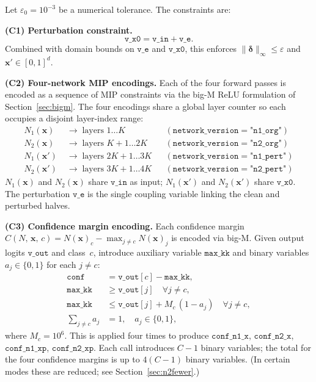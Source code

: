 \documentclass[11pt,a4paper]{article}
\theoremstyle{definition}
\theoremstyle{plain}
\newcommand{\Conf}[3]{C(#1,\,#2,\,#3)}
\newcommand{\NN}[1]{N_{#1}}
\newcommand{\vx}{\mathbf{x}}
\newcommand{\ve}{\boldsymbol{\delta}}
\newcommand{\vxp}{\mathbf{x}'}
\newcommand{\eps}{\varepsilon}
\newcommand{\epszero}{\varepsilon_0}
\begin{document}
Let $\epszero = 10^{-3}$ be a numerical tolerance. The constraints are:

\medskip
\noindent\textbf{(C1) Perturbation constraint.}
\[
  \mathtt{v\_x0} = \mathtt{v\_in} + \mathtt{v\_e}.
\]
Combined with domain bounds on $\mathtt{v\_e}$ and $\mathtt{v\_x0}$, this enforces $\|\ve\|_\infty \le \eps$ and $\vxp \in [0,1]^d$.

\medskip
\noindent\textbf{(C2) Four-network MIP encodings.}
Each of the four forward passes is encoded as a sequence of MIP constraints via the big-M ReLU formulation of Section~\ref{sec:bigm}. The four encodings share a global layer counter so each occupies a disjoint layer-index range:
\begin{align*}
  \NN{1}(\vx)  &\;\to\; \text{layers } 1\ldots K           &&(\texttt{network\_version} = \texttt{"n1\_org"})  \\
  \NN{2}(\vx)  &\;\to\; \text{layers } K+1\ldots 2K         &&(\texttt{network\_version} = \texttt{"n2\_org"})  \\
  \NN{1}(\vxp) &\;\to\; \text{layers } 2K+1\ldots 3K        &&(\texttt{network\_version} = \texttt{"n1\_pert"}) \\
  \NN{2}(\vxp) &\;\to\; \text{layers } 3K+1\ldots 4K        &&(\texttt{network\_version} = \texttt{"n2\_pert"})
\end{align*}
$\NN{1}(\vx)$ and $\NN{2}(\vx)$ share $\mathtt{v\_in}$ as input; $\NN{1}(\vxp)$ and $\NN{2}(\vxp)$ share $\mathtt{v\_x0}$. The perturbation $\mathtt{v\_e}$ is the single coupling variable linking the clean and perturbed halves.

\medskip
\noindent\textbf{(C3) Confidence margin encoding.}
Each confidence margin $\Conf{N}{\vx}{c} = N(\vx)_c - \max_{j\ne c} N(\vx)_j$ is encoded via big-M. Given output logits $\mathtt{v\_out}$ and class~$c$, introduce auxiliary variable $\mathtt{max\_kk}$ and binary variables $a_j \in \{0,1\}$ for each $j \ne c$:
\begin{align}
  \mathtt{conf} &= \mathtt{v\_out}[c] - \mathtt{max\_kk}, \label{eq:conf}\\
  \mathtt{max\_kk} &\ge \mathtt{v\_out}[j] \quad \forall j \ne c, \label{eq:max_lb}\\
  \mathtt{max\_kk} &\le \mathtt{v\_out}[j] + M_c\,(1-a_j) \quad \forall j \ne c, \label{eq:max_ub}\\
  \sum_{j \ne c} a_j &= 1, \quad a_j \in \{0,1\}, \label{eq:max_sum}
\end{align}
where $M_c = 10^6$. This is applied four times to produce $\mathtt{conf\_n1\_x}$, $\mathtt{conf\_n2\_x}$, $\mathtt{conf\_n1\_xp}$, $\mathtt{conf\_n2\_xp}$. Each call introduces $C-1$ binary variables; the total for the four confidence margins is up to $4(C-1)$ binary variables. (In certain modes these are reduced; see Section~\ref{sec:n2fewer}.)
\end{document}
